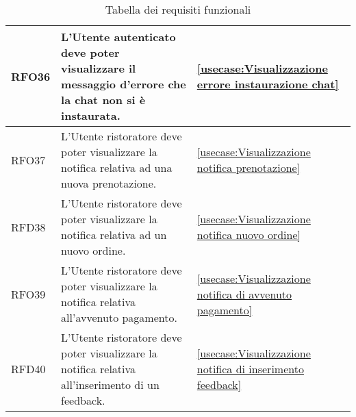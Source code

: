 \begin{table}[H]
\begin{tabularx}{\textwidth}{l|X|p{2cm}}
		\hline
		RFO36       & L'Utente autenticato deve poter visualizzare il messaggio d'errore che la chat non si è instaurata.               & \autoref{usecase:Visualizzazione errore instaurazione chat}                           \\
		\hline
		RFO37       & L'Utente ristoratore deve poter visualizzare la notifica relativa ad una nuova prenotazione.                      & \autoref{usecase:Visualizzazione notifica prenotazione}                               \\
		\hline
		RFD38       & L'Utente ristoratore deve poter visualizzare la notifica relativa ad un nuovo ordine.                             & \autoref{usecase:Visualizzazione notifica nuovo ordine}                               \\
		\hline
		RFO39       & L'Utente ristoratore deve poter visualizzare la notifica relativa all'avvenuto pagamento.                         & \autoref{usecase:Visualizzazione notifica di avvenuto pagamento}                      \\
		\hline
		RFD40       & L'Utente ristoratore deve poter visualizzare la notifica relativa all'inserimento di un feedback.                 & \autoref{usecase:Visualizzazione notifica di inserimento feedback}                    \\
	\end{tabularx}
	\caption{Tabella dei requisiti funzionali}
\end{table}


